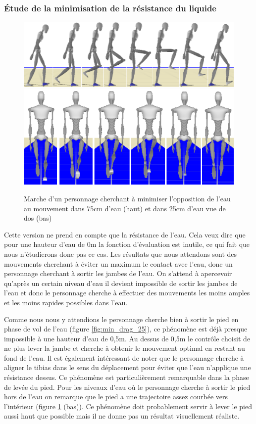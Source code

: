 \documentclass[runningheads,a4paper]{llncs}
\begin{document}
\subsubsection{Étude de la minimisation de la résistance du liquide}


\vspace*{-1cm}
\begin{figure}[h]
\centering
\includegraphics[scale=0.4]{strips/min_drag_75cm.png}
\includegraphics[scale=0.4]{strips/min_drag_25cm_from_back.png}
\caption{Marche d'un personnage cherchant à minimiser l'opposition de l'eau au mouvement dans 75cm d'eau (haut) et dans 25cm d'eau vue de dos (bas)}
\label{fig:min_drag2}
\end{figure}

Cette version ne prend en compte que la résistance de l'eau. Cela veux dire que pour une hauteur d'eau de 0m la fonction d'évaluation est inutile, ce qui fait que nous n'étudierons donc pas ce cas. Les résultats que nous attendons sont des mouvements cherchant à éviter un maximum le contact avec l'eau, donc un personnage cherchant à sortir les jambes de l'eau. On s'attend à apercevoir qu'après un certain niveau d'eau il devient impossible de sortir les jambes de l'eau et donc le personnage cherche à effectuer des mouvements les moins amples et les moins rapides possibles dans l'eau. 
 
Comme nous nous y attendions le personnage cherche bien à sortir le pied en phase de vol de l'eau (figure \ref{fig:min_drag_25}), ce phénomène est déjà presque impossible à une hauteur d'eau de 0,5m. Au dessus de 0,5m le contrôle choisit de ne plus lever la jambe et cherche à obtenir le mouvement optimal en restant au fond de l'eau. Il est également intéressant de noter que le personnage cherche à aligner le tibias dans le sens du déplacement pour éviter que l'eau n'applique une résistance dessus. Ce phénomène est particulièrement remarquable dans la phase de levée du pied. Pour les niveaux d'eau où le personnage cherche à sortir le pied hors de l'eau on remarque que le pied a une trajectoire assez courbée vers l'intérieur (figure \ref{fig:min_drag2} (bas)). Ce phénomène doit probablement servir à lever le pied aussi haut que possible mais il ne donne pas un résultat visuellement réaliste.  
\end{document}
